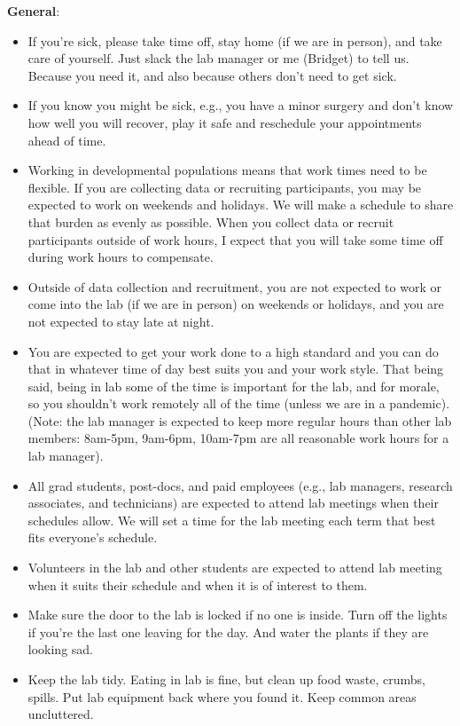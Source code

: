 \documentclass[
]{book}
\providecommand{\tightlist}{%
  \setlength{\itemsep}{0pt}\setlength{\parskip}{0pt}}
\begin{document}
\textbf{General}:

\begin{itemize}
\tightlist
\item
  If you're sick, please take time off, stay home (if we are in person), and take care of yourself. Just slack the lab manager or me (Bridget) to tell us. Because you need it, and also because others don't need to get sick.
\item
  If you know you might be sick, e.g., you have a minor surgery and don't know how well you will recover, play it safe and reschedule your appointments ahead of time.
\item
  Working in developmental populations means that work times need to be flexible. If you are collecting data or recruiting participants, you may be expected to work on weekends and holidays. We will make a schedule to share that burden as evenly as possible. When you collect data or recruit participants outside of work hours, I expect that you will take some time off during work hours to compensate.
\item
  Outside of data collection and recruitment, you are not expected to work or come into the lab (if we are in person) on weekends or holidays, and you are not expected to stay late at night.
\item
  You are expected to get your work done to a high standard and you can do that in whatever time of day best suits you and your work style. That being said, being in lab some of the time is important for the lab, and for morale, so you shouldn't work remotely all of the time (unless we are in a pandemic). (Note: the lab manager is expected to keep more regular hours than other lab members: 8am-5pm, 9am-6pm, 10am-7pm are all reasonable work hours for a lab manager).
\item
  All grad students, post-docs, and paid employees (e.g., lab managers, research associates, and technicians) are expected to attend lab meetings when their schedules allow. We will set a time for the lab meeting each term that best fits everyone's schedule.
\item
  Volunteers in the lab and other students are expected to attend lab meeting when it suits their schedule and when it is of interest to them.
\item
  Make sure the door to the lab is locked if no one is inside. Turn off the lights if you're the last one leaving for the day. And water the plants if they are looking sad.
\item
  Keep the lab tidy. Eating in lab is fine, but clean up food waste, crumbs, spills. Put lab equipment back where you found it. Keep common areas uncluttered.

\end{itemize}
\end{document}
